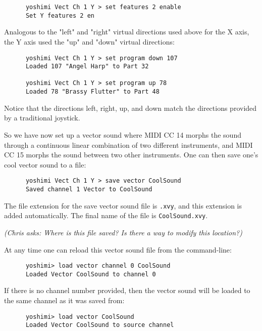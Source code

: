    \begin{verbatim}
      yoshimi Vect Ch 1 Y > set features 2 enable
      Set Y features 2 en
   \end{verbatim}

   Analogous to the "left" and "right" virtual directions used above for the X
   axis, the Y axis used the "up" and "down" virtual directions:

   \begin{verbatim}
      yoshimi Vect Ch 1 Y > set program down 107
      Loaded 107 "Angel Harp" to Part 32

      yoshimi Vect Ch 1 Y > set program up 78
      Loaded 78 "Brassy Flutter" to Part 48
   \end{verbatim}

   Notice that the directions left, right, up, and down match the directions
   provided by a traditional joystick.

   So we have now set up a vector sound where MIDI CC 14 morphs the sound
   through a continuous linear combination of two different instruments,
   and MIDI CC 15 morphs the sound between two other instruments.
   One can then save one's cool vector sound to a file:

   \begin{verbatim}
      yoshimi Vect Ch 1 Y > save vector CoolSound
      Saved channel 1 Vector to CoolSound
   \end{verbatim}

   The file extension for the save vector sound file is \texttt{.xvy}, and
   this extension is added automatically.  The final name of the file is
   \texttt{CoolSound.xvy}.

   \textsl{(Chris asks:  Where is this file saved?  Is there a way to modify
   this location?)}

   At any time one can reload this vector sound file from the command-line:

   \begin{verbatim}
      yoshimi> load vector channel 0 CoolSound
      Loaded Vector CoolSound to channel 0
   \end{verbatim}

   If there is no channel number provided, then the vector sound
   will be loaded to the same channel as it was saved from:

   \begin{verbatim}
      yoshimi> load vector CoolSound
      Loaded Vector CoolSound to source channel
   \end{verbatim}

